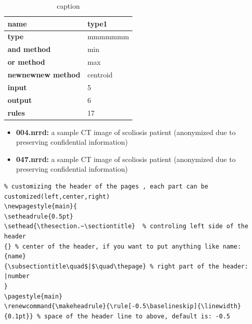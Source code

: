 \documentclass[12pt]{article}
\renewcommand{\makeheadrule}{\rule[-0.5\baselineskip]{\linewidth}{0.1pt}} %
\begin{document}
\begin{table}[ht]
	\centering
	\caption{caption}
	\label{table:1}
	\begin{tabular}{|l|l|}
		\hline
		\textbf{name}                   & type1          \\ \hline
		\textbf{type}                   & mmmmmmm        \\ \hline
		\textbf{and method}             & min            \\ \hline
		\textbf{or method}              & max            \\ \hline
		\textbf{newnewnew method}       & centroid       \\ \hline
		\textbf{input}                  & 5              \\ \hline
		\textbf{output}                 & 6              \\ \hline
		\textbf{rules}                  & 17             \\ \hline
	\end{tabular}
\end{table}

\begin{itemize}
	\item
	\textbf{004.nrrd:} a sample CT image of scoliosis patient (anonymized due to preserving confidential information)
	\item
	\textbf{047.nrrd:} a sample CT image of scoliosis patient (anonymized due to preserving confidential information)
\end{itemize}

\begin{lstlisting}
% customizing the header of the pages , each part can be customized(left,center,right)
\newpagestyle{main}{ 
\setheadrule{0.5pt}
\sethead{\thesection.~\sectiontitle}  % controling left side of the header 
{} % center of the header, if you want to put anything like name: {name}
{\subsectiontitle\quad$|$\quad\thepage} % right part of the header: |number
}
\pagestyle{main}
\renewcommand{\makeheadrule}{\rule[-0.5\baselineskip]{\linewidth}{0.1pt}} % space of the header line to above, default is: -0.5
\end{lstlisting}


\newpage



\end{document}
